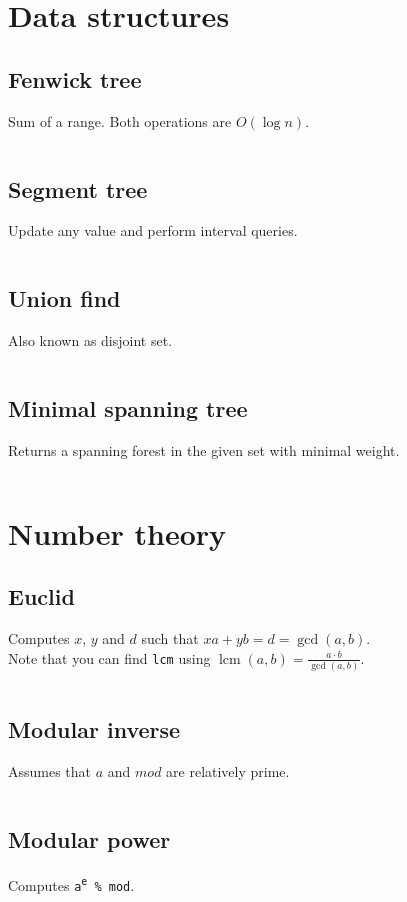 \documentclass[10pt,a4paper,landscape,oneside]{amsart}
\newcommand{\code}[1]{\inputminted[fontsize=\large,tabsize=2,baselinestretch=1]{java}{#1}}
\begin{document}
\begin{multicols*}{2}

\section{Data structures}
\subsection{Fenwick tree}
Sum of a range. Both operations are \(O(\log n)\).
\code{data-structures/fenwick.java}
\subsection{Segment tree}
Update any value and perform interval queries.
\code{data-structures/segment-tree.java}
\subsection{Union find}
Also known as disjoint set.
\code{data-structures/union-find.java}
\subsection{Minimal spanning tree}
Returns a spanning forest in the given set with minimal weight.
\code{graph/kruskal.java}

\section{Number theory}
\subsection{Euclid}
Computes \(x\), \(y\) and \(d\) such that \(xa + yb = d = \operatorname{gcd}(a,b)\). \\
Note that you can find \texttt{lcm} using \(\operatorname{lcm}(a,b) = \frac{a \cdot
b}{\operatorname{gcd}(a,b)}\).
\code{number-theory/euclid.java}
\subsection{Modular inverse}
Assumes that \(a\) and \(mod\) are relatively prime.
\code{number-theory/mod-inverse.java}
\subsection{Modular power}
Computes \texttt{a\textsuperscript e \% mod}.
\code{number-theory/mod-pow.java}

\end{multicols*}
\end{document}
